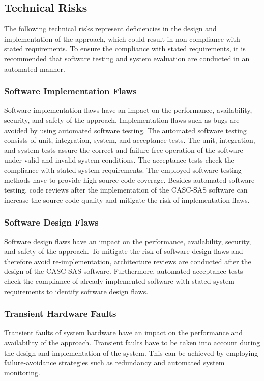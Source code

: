 \subsection{Technical Risks}
\label{sec:risk_assessment_technical}
The following technical risks represent deficiencies in the design and implementation of the approach, which could result in non-compliance with stated requirements.
To ensure the compliance with stated requirements, it is recommended that software testing and system evaluation are conducted in an automated manner.

\subsubsection{Software Implementation Flaws}
Software implementation flaws have an impact on the performance, availability, security, and safety of the approach.
Implementation flaws such as bugs are avoided by using automated software testing.
The automated software testing consists of unit, integration, system, and acceptance tests.
The unit, integration, and system tests assure the correct and failure-free operation of the software under valid and invalid system conditions.
The acceptance tests check the compliance with stated system requirements.
The employed software testing methods have to provide high source code coverage.
Besides automated software testing, code reviews after the implementation of the CASC-SAS software can increase the source code quality and mitigate the risk of implementation flaws.

\subsubsection{Software Design Flaws}
Software design flaws have an impact on the performance, availability, security, and safety of the approach.
To mitigate the risk of software design flaws and therefore avoid re-implementation, architecture reviews are conducted after the design of the CASC-SAS software.
Furthermore, automated acceptance tests check the compliance of already implemented software with stated system requirements to identify software design flaws.

\subsubsection{Transient Hardware Faults}
Transient faults of system hardware have an impact on the performance and availability of the approach.
Transient faults have to be taken into account during the design and implementation of the system.
This can be achieved by employing failure-avoidance strategies such as redundancy and automated system monitoring.


